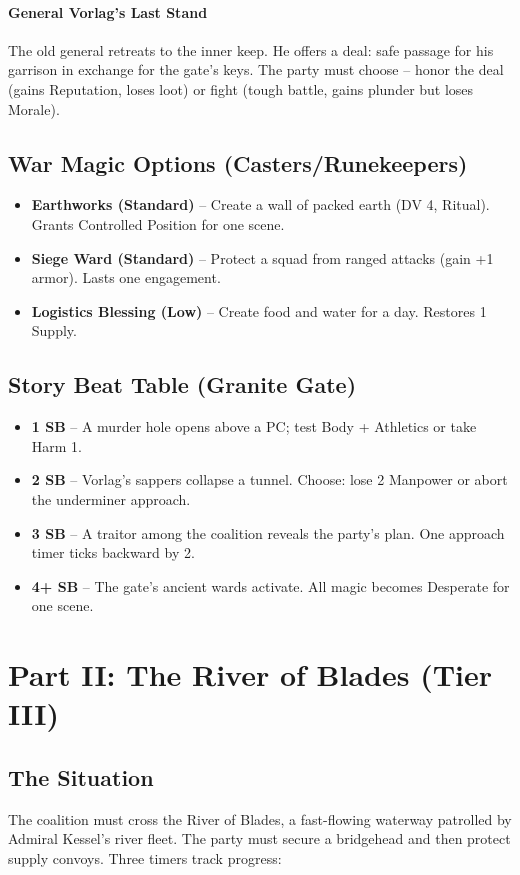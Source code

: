 \documentclass[11pt]{article}
\begin{document}
\paragraph{General Vorlag's Last Stand}
The old general retreats to the inner keep. He offers a deal: safe passage for his garrison in exchange for the gate's keys. The party must choose -- honor the deal (gains Reputation, loses loot) or fight (tough battle, gains plunder but loses Morale).

\subsection*{War Magic Options (Casters/Runekeepers)}
\begin{itemize}
\item \textbf{Earthworks (Standard)} -- Create a wall of packed earth (DV 4, Ritual). Grants Controlled Position for one scene.
\item \textbf{Siege Ward (Standard)} -- Protect a squad from ranged attacks (gain +1 armor). Lasts one engagement.
\item \textbf{Logistics Blessing (Low)} -- Create food and water for a day. Restores 1 Supply.
\end{itemize}

\subsection*{Story Beat Table (Granite Gate)}
\begin{itemize}
\item \textbf{1 SB} -- A murder hole opens above a PC; test Body + Athletics or take Harm 1.
\item \textbf{2 SB} -- Vorlag's sappers collapse a tunnel. Choose: lose 2 Manpower or abort the underminer approach.
\item \textbf{3 SB} -- A traitor among the coalition reveals the party's plan. One approach timer ticks backward by 2.
\item \textbf{4+ SB} -- The gate's ancient wards activate. All magic becomes Desperate for one scene.
\end{itemize}

\section*{Part II: The River of Blades (Tier III)}

\subsection*{The Situation}
The coalition must cross the River of Blades, a fast-flowing waterway patrolled by Admiral Kessel's river fleet. The party must secure a bridgehead and then protect supply convoys. Three timers track progress:
\end{document}

